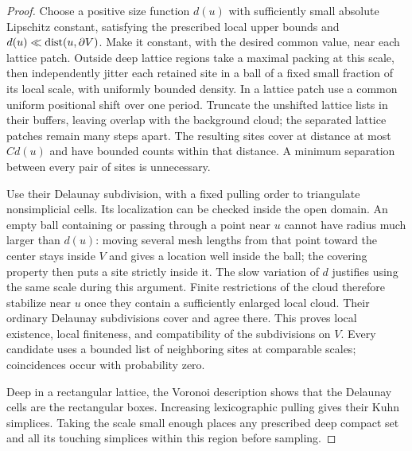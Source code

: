 \begin{proof}
Choose a positive size function $d(u)$ with sufficiently small absolute
Lipschitz constant, satisfying the prescribed local upper bounds and
$d(u)\ll\operatorname{dist}(u,\partial V)$.  Make it constant, with the desired
common value, near each lattice patch.  Outside deep lattice regions
take a maximal packing at this scale, then independently jitter each
retained site in a ball of a fixed small fraction of its local scale,
with uniformly bounded density.  In a lattice patch use a common
uniform positional shift over one period.  Truncate the unshifted
lattice lists in their buffers, leaving overlap with the background
cloud; the separated lattice patches remain many steps apart.
The resulting sites cover at distance at most $Cd(u)$ and have
bounded counts within that distance.  A minimum separation between
every pair of sites is unnecessary.

Use their Delaunay subdivision, with a fixed pulling order to
triangulate nonsimplicial cells.  Its localization can be checked
inside the open domain.  An empty ball containing or passing through
a point near $u$ cannot have radius much larger than $d(u)$: moving
several mesh lengths from that point toward the center stays inside
$V$ and gives a location well inside the ball; the covering property
then puts a site strictly inside it.  The slow variation of $d$
justifies using the same scale during this argument.  Finite
restrictions of the cloud therefore stabilize near $u$ once they
contain a sufficiently enlarged local cloud.  Their ordinary Delaunay
subdivisions cover and agree there.  This proves local existence,
local finiteness, and compatibility of the subdivisions on $V$.
Every candidate uses a bounded list of neighboring sites at comparable
scales; coincidences occur with probability zero.

Deep in a rectangular lattice, the Voronoi description shows that the
Delaunay cells are the rectangular boxes.  Increasing lexicographic
pulling gives their Kuhn simplices.  Taking the scale small enough
places any prescribed deep compact set and all its touching simplices
within this region before sampling.


\end{proof}
